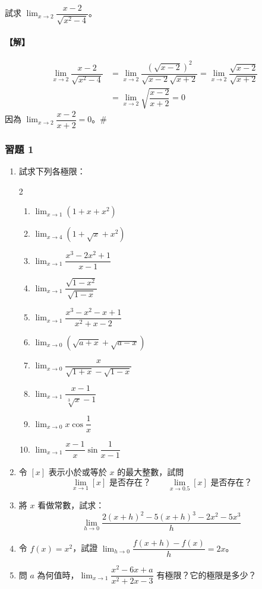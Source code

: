 \begin{example}\label{ex:b6-app4-6}
試求 $\lim_{x\to 2} \dfrac{x-2}{\sqrt{x^2-4}}$。
\end{example}

\paragraph{【解】}
\begin{align*}
\lim_{x\to 2} \dfrac{x-2}{\sqrt{x^2-4}} &= \lim_{x\to 2}\dfrac{(\sqrt{x-2})^2}{\sqrt{x-2}\sqrt{x+2}} = \lim_{x\to 2}\dfrac{\sqrt{x-2}}{\sqrt{x+2}} \\
&= \lim_{x\to 2}\sqrt{\dfrac{x-2}{x+2}} = 0
\end{align*}
因為 $\lim_{x\to 2}\dfrac{x-2}{x+2} = 0$。\hfill$\#$

\subsubsection*{習題 1}\label{sec:b6-ex-app4-1}

\begin{enumerate}[label=\arabic*., leftmargin=2em]
  \item 試求下列各極限：
  \begin{multicols}{2}
  \begin{enumerate}[label=(\arabic*)]
    \item $\lim_{x\to 1}(1+x+x^2)$
    \item $\lim_{x\to 4}(1+\sqrt{x}+x^2)$
    \item $\lim_{x\to 1}\dfrac{x^3-2x^2+1}{x-1}$
    \item $\lim_{x\to 1}\dfrac{\sqrt{1-x^2}}{\sqrt{1-x}}$
    \item $\lim_{x\to 1}\dfrac{x^3-x^2-x+1}{x^2+x-2}$
    \item $\lim_{x\to 0}(\sqrt{a+x}+\sqrt{a-x})$
    \item $\lim_{x\to 0}\dfrac{x}{\sqrt{1+x}-\sqrt{1-x}}$
    \item $\lim_{x\to 1}\dfrac{x-1}{\sqrt[3]{x}-1}$
    \item $\lim_{x\to 0}x\cos\dfrac{1}{x}$
    \item $\lim_{x\to 1}\dfrac{x-1}{x}\sin\dfrac{1}{x-1}$
  \end{enumerate}
  \end{multicols}

  \item 令 $[x]$ 表示小於或等於 $x$ 的最大整數，試問
  \[ \lim_{x\to 1}[x] \text{ 是否存在？} \qquad \lim_{x\to 0.5}[x] \text{ 是否存在？} \]

  \item 將 $x$ 看做常數，試求：
  \[ \lim_{h\to 0}\dfrac{2(x+h)^2 - 5(x+h)^3 - 2x^2 - 5x^3}{h} \]

  \item 令 $f(x)=x^2$，試證 $\lim_{h\to 0}\dfrac{f(x+h)-f(x)}{h} = 2x$。

  \item 問 $a$ 為何值時，$\lim_{x\to 1}\dfrac{x^2-6x+a}{x^2+2x-3}$ 有極限？它的極限是多少？
\end{enumerate}

